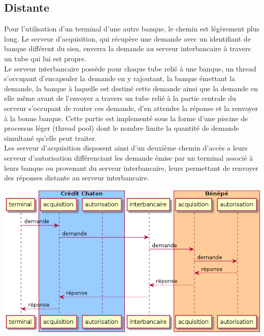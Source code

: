 \documentclass[french, a4paper, 12pt, titlepage]{article}
\begin{document}
\subsection{Distante}
Pour l'utilisation d'un terminal d'une autre banque, le chemin est légèrement plus long.
Le serveur d'acquisition, qui récupère une demande avec un identifiant de banque différent du sien, enverra la demande au serveur interbancaire à travers un tube qui lui est propre.\\
\noindent
Le serveur interbancaire possède pour chaque tube relié à une banque, un thread s'occupant d'encapsuler la demande en y rajoutant, la banque émettant la demande, la banque à laquelle est destiné cette demande ainsi que la demande en elle même avant de l'envoyer a travers un tube relié à la partie centrale du serveur s'occupant de router ces demande, d'en attendre la réponse et la renvoyer à la bonne banque.
Cette partie est implementé sous la forme d'une piscine de processus léger (thread pool) dont le nombre limite la quantité de demande simultané qu'elle peut traiter.\\
\noindent
Les serveur d'acquisition disposent ainsi d'un deuxième chemin d'accès a leurs serveur d'autorisation différenciant les demande émise par un terminal associé à leurs banque ou provenant du serveur interbancaire, leurs permettant de renvoyer des réponses distante au serveur interbancaire.
\medskip
\begin{center}
\includegraphics[scale=0.6]{transactionDistante}
\end{center}
\medskip
\end{document}
